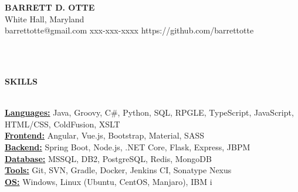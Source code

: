 \documentclass{article}
\newcommand{\lineunder}{
	\vspace*{-4pt}\\ 
	\hspace*{-18pt}\hrulefill \\
}
\newcommand{\header}[1]{
	{\hspace*{-15pt}\vspace*{6pt}\textsc{#1}}\vspace*{-6pt}\lineunder
}
\newcommand{\contact}[5]{
	\vspace*{-8pt}
	\begin{center}
		{\Large \textbf \scshape {#1}}\\
		\normalsize #2\\
		\normalsize #3 \hspace*{20pt} 
		\normalsize #4 \hspace*{20pt}
		\normalsize #5
		\lineunder
	\end{center}
	\vspace*{-8pt}
}
\newcommand{\resumeheader}[1]{
	\vspace*{10pt}
	\header{\textbf{#1}}
    \vspace*{5pt}
}
\begin{document}
	\normalsize
	\smallskip
	\vspace*{-44pt}

	\contact
		{\bfseries BARRETT D. OTTE}
		{White Hall, Maryland}
		{barrettotte@gmail.com}
		{xxx-xxx-xxxx}
		{https://github.com/barrettotte}

	\resumeheader{SKILLS}
		\textbf{\underline{Languages:}}
			Java, Groovy, C\#, Python, SQL, RPGLE, TypeScript, JavaScript, HTML/CSS, ColdFusion, XSLT \\ \vspace*{5pt}
		\textbf{\underline{Frontend:}}
			Angular, Vue.js, Bootstrap, Material, SASS \\ \vspace*{5pt}
        \textbf{\underline{Backend:}}
			Spring Boot, Node.js, .NET Core, Flask, Express, JBPM \\ \vspace*{5pt}
        \textbf{\underline{Database:}}
			MSSQL, DB2, PostgreSQL, Redis, MongoDB \\ \vspace*{5pt}
		\textbf{\underline{Tools:}}
			Git, SVN, Gradle, Docker, Jenkins CI, Sonatype Nexus \\ \vspace*{5pt}
        \textbf{\underline{OS:}}
            Windows, Linux (Ubuntu, CentOS, Manjaro), IBM i
\end{document}
